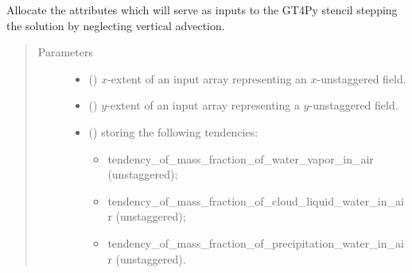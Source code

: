 \documentclass[letterpaper,10pt,english]{sphinxmanual}
\begin{document}
\begin{fulllineitems}
\begin{fulllineitems}
\label{\detokenize{api:dycore.prognostic_isentropic_centered.PrognosticIsentropicCentered._stencils_stepping_by_neglecting_vertical_advection_allocate_inputs}}
Allocate the attributes which will serve as inputs to the GT4Py stencil stepping the solution
by neglecting vertical advection.
\begin{quote}\begin{description}
\item[{Parameters}] \leavevmode\begin{itemize}
\item {} 
 () \textendash{} \(x\)-extent of an input array representing an \(x\)-unstaggered field.

\item {} 
 () \textendash{} \(y\)-extent of an input array representing a \(y\)-unstaggered field.

\item {} 
 () \textendash{} 
{\hyperref[\detokenize{api:storages.grid_data.GridData}]{}} storing the following tendencies:
\begin{itemize}
\item {} 
tendency\_of\_mass\_fraction\_of\_water\_vapor\_in\_air (unstaggered);

\item {} 
tendency\_of\_mass\_fraction\_of\_cloud\_liquid\_water\_in\_air (unstaggered);

\item {} 
tendency\_of\_mass\_fraction\_of\_precipitation\_water\_in\_air (unstaggered).

\end{itemize}


\end{itemize}

\end{description}\end{quote}

\end{fulllineitems}



\end{fulllineitems}
\end{document}
